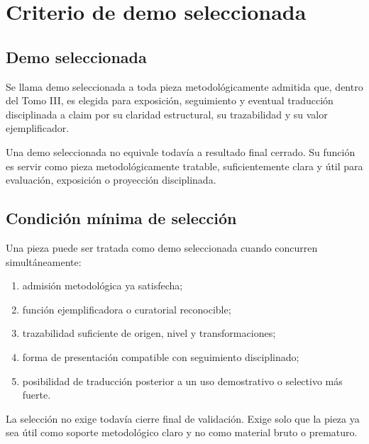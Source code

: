 \chapter{Criterio de demo seleccionada}

\section{Demo seleccionada}
\begin{definition}
Se llama demo seleccionada a toda pieza metodológicamente admitida que, dentro del Tomo III, es elegida para exposición, seguimiento y eventual traducción disciplinada a claim por su claridad estructural, su trazabilidad y su valor ejemplificador.
\end{definition}

\begin{observation}
Una demo seleccionada no equivale todavía a resultado final cerrado. Su función es servir como pieza metodológicamente tratable, suficientemente clara y útil para evaluación, exposición o proyección disciplinada.
\end{observation}

\section{Condición mínima de selección}
\begin{definition}
Una pieza puede ser tratada como demo seleccionada cuando concurren simultáneamente:
\begin{enumerate}
  \item admisión metodológica ya satisfecha;
  \item función ejemplificadora o curatorial reconocible;
  \item trazabilidad suficiente de origen, nivel y transformaciones;
  \item forma de presentación compatible con seguimiento disciplinado;
  \item posibilidad de traducción posterior a un uso demostrativo o selectivo más fuerte.
\end{enumerate}
\end{definition}

\begin{observation}
La selección no exige todavía cierre final de validación. Exige solo que la pieza ya sea útil como soporte metodológico claro y no como material bruto o prematuro.
\end{observation}

